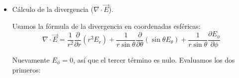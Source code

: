 \documentclass[11pt,spanish]{article}
\begin{document}
\begin{itemize}
Teóricamente, sabemos de antemano que $\nabla \times \vec{E} = \vec{0}$ porque el campo eléctrico deriva de un potencial escalar ($\nabla \times (-\nabla\varphi) \equiv 0$). Sin embargo, vamos a verificarlo explícitamente calculándolo.
Las componentes de nuestro campo son $E_r = \frac{2k\cos\theta}{r^3}$, $E_\theta = \frac{k\sin\theta}{r^3}$ y $E_\phi = 0$.

De la fórmula del rotor en esféricas:
$$
\nabla \times \vec{E} = \frac{1}{r\sin\theta} \left( \frac{\partial}{\partial \theta}(\sin\theta E_\phi) - \frac{\partial E_\theta}{\partial \phi} \right) \hat{e}_r + \frac{1}{r} \left( \frac{1}{\sin\theta}\frac{\partial E_r}{\partial \phi} - \frac{\partial}{\partial r}(r E_\phi) \right) \hat{e}_\theta + \frac{1}{r} \left( \frac{\partial}{\partial r}(r E_\theta) - \frac{\partial E_r}{\partial \theta} \right) \hat{e}_\phi
$$

\begin{itemize}
\item Componente $\hat{e}_r$: Como $E_\phi = 0$ y $E_\theta$ no depende de $\phi$, esta componente se anula.
\item Componente $\hat{e}_\theta$: Como $E_r$ no depende de $\phi$ y $E_\phi = 0$, esta componente también se anula.
\item Componente $\hat{e}_\phi$: Calculamos los términos dentro del paréntesis:
    $$
    \frac{\partial}{\partial r}(r E_\theta) = \frac{\partial}{\partial r} \left( r \frac{k\sin\theta}{r^3} \right) = \frac{\partial}{\partial r} \left( k\sin\theta \, r^{-2} \right) = -2k \frac{\sin\theta}{r^3}
    $$
    $$
    \frac{\partial E_r}{\partial \theta} = \frac{\partial}{\partial \theta} \left( \frac{2k\cos\theta}{r^3} \right) = -2k \frac{\sin\theta}{r^3}
    $$
    Restando ambos términos: $\left(-2k \frac{\sin\theta}{r^3}\right) - \left(-2k \frac{\sin\theta}{r^3}\right) = 0$.

Por lo tanto, queda verificado que:
$$
\nabla \times \vec{E} = \vec{0}
$$
\end{itemize}

\item Cálculo de la divergencia ($\nabla \cdot \vec{E}$).

Usamos la fórmula de la divergencia en coordenadas esféricas:
$$
\nabla \cdot \vec{E} = \frac{1}{r^2} \frac{\partial}{\partial r}(r^2 E_r) + \frac{1}{r\sin\theta} \frac{\partial}{\partial \theta}(\sin\theta E_\theta) + \frac{1}{r\sin\theta} \frac{\partial E_\phi}{\partial \phi}
$$

Nuevamente $E_\phi = 0$, así que el tercer término es nulo. Evaluamos los dos primeros:


\end{itemize}
\end{document}
